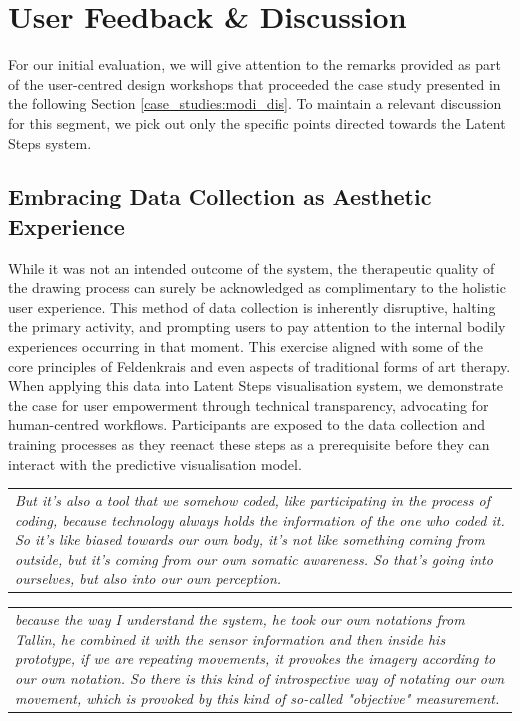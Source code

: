 \section{User Feedback \& Discussion}

For our initial evaluation, we will give attention to the remarks provided as part of the user-centred design workshops that proceeded the case study presented in the following Section \ref{case_studies:modi_dis}. To maintain a relevant discussion for this segment, we pick out only the specific points directed towards the Latent Steps system.

\subsection*{Embracing Data Collection as Aesthetic Experience}

While it was not an intended outcome of the system, the therapeutic quality of the drawing process can surely be acknowledged as complimentary to the holistic user experience. This method of data collection is inherently disruptive, halting the primary activity, and prompting users to pay attention to the internal bodily experiences occurring in that moment. This exercise aligned with some of the core principles of Feldenkrais and even aspects of traditional forms of art therapy. When applying this data into Latent Steps visualisation system, we demonstrate the case for user empowerment through technical transparency, advocating for human-centred workflows. Participants are exposed to the data collection and training processes as they reenact these steps as a prerequisite before they can interact with the predictive visualisation model.

\begin{center}
\begin{tabular}{ p{13cm}}
\textit{But it's also a tool that we somehow coded, like participating in the process of coding, because technology always holds the information of the one who coded it. So it's like biased towards our own body, it's not like something coming from outside, but it's coming from our own somatic awareness. So that's going into ourselves, but also into our own perception.}
\end{tabular}
\end{center}

\begin{center}
\begin{tabular}{ p{13cm}}
\textit{because the way I understand the system, he took our own notations from Tallin, he combined it with the sensor information and then inside his prototype, if we are repeating movements, it provokes the imagery according to our own notation. So there is this kind of introspective way of notating our own movement, which is provoked by this kind of so-called "objective" measurement.}
\end{tabular}
\end{center}

